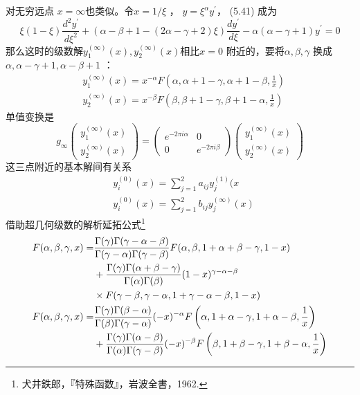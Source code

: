对无穷远点 $x=\infty $也类似。令$ x=1/\xi$ ， $y=\xi^{\alpha} y^{\prime} $， (5.41) 成为
\begin{equation}
	\xi(1-\xi) \frac{d^{2} y^{\prime}}{d \xi^{2}}+(\alpha-\beta+1-(2 \alpha-\gamma+2) \xi) \frac{d y^{\prime}}{d \xi}-\alpha(\alpha-\gamma+1) y^{\prime}=0
\end{equation} 
那么这时的级数解$ y_{1}^{(\infty)}(x), y_{2}^{(\infty)}(x) $相比$ x=0$ 附近的，要将$ \alpha,\beta,\gamma$ 换成 $\alpha,\alpha-\gamma+1,\alpha-\beta+1$ ：
\begin{equation}
	\begin{aligned} &y_{1}^{(\infty)}(x)=x^{-\alpha} F\left(\alpha, \alpha+1-\gamma, \alpha+1-\beta, \frac{1}{x}\right) \\ &y_{2}^{(\infty)}(x)=x^{-\beta} F\left(\beta, \beta+1-\gamma, \beta+1-\alpha, \frac{1}{x}\right) \end{aligned}
\end{equation}
单值变换是
\begin{equation}
	g_{\infty}\left(\begin{array}{c} y_{1}^{(\infty)}(x) \\ y_{2}^{(\infty)}(x) \end{array}\right)=\left(\begin{array}{cc} e^{-2 \pi i \alpha} & 0 \\ 0 & e^{-2 \pi i \beta} \end{array}\right)\left(\begin{array}{l} y_{1}^{(\infty)}(x) \\ y_{2}^{(\infty)}(x) \end{array}\right)
\end{equation} 
这三点附近的基本解间有关系
\begin{align} &y_{i}^{(0)}(x)=\sum_{j=1}^{2} a_{i j} y_{j}^{(1)}(x \\ &y_{i}^{(0)}(x)=\sum_{j=1}^{2} b_{i j} y_{j}^{(\infty)}(x) \end{align}
借助超几何级数的解析延拓公式\footnote{犬井鉄郎，『特殊函数』，岩波全書，1962.}
\begin{align} F(\alpha, \beta, \gamma, x)=& \frac{\Gamma(\gamma) \Gamma(\gamma-\alpha-\beta)}{\Gamma(\gamma-\alpha) \Gamma(\gamma-\beta)} F(\alpha, \beta, 1+\alpha+\beta-\gamma, 1-x) \notag\\ &+\frac{\Gamma(\gamma) \Gamma(\alpha+\beta-\gamma)}{\Gamma(\alpha) \Gamma(\beta)}(1-x)^{\gamma-\alpha-\beta} \\ & \times F(\gamma-\beta, \gamma-\alpha, 1+\gamma-\alpha-\beta, 1-x)\notag\\ F(\alpha, \beta, \gamma, x)=& \frac{\Gamma(\gamma) \Gamma(\beta-\alpha)}{\Gamma(\beta) \Gamma(\gamma-\alpha)}(-x)^{-\alpha} F\left(\alpha, 1+\alpha-\gamma, 1+\alpha-\beta, \frac{1}{x}\right) \notag\\ &+\frac{\Gamma(\gamma) \Gamma(\alpha-\beta)}{\Gamma(\alpha) \Gamma(\gamma-\beta)}(-x)^{-\beta} F\left(\beta, 1+\beta-\gamma, 1+\beta-\alpha, \frac{1}{x}\right) \end{align}
